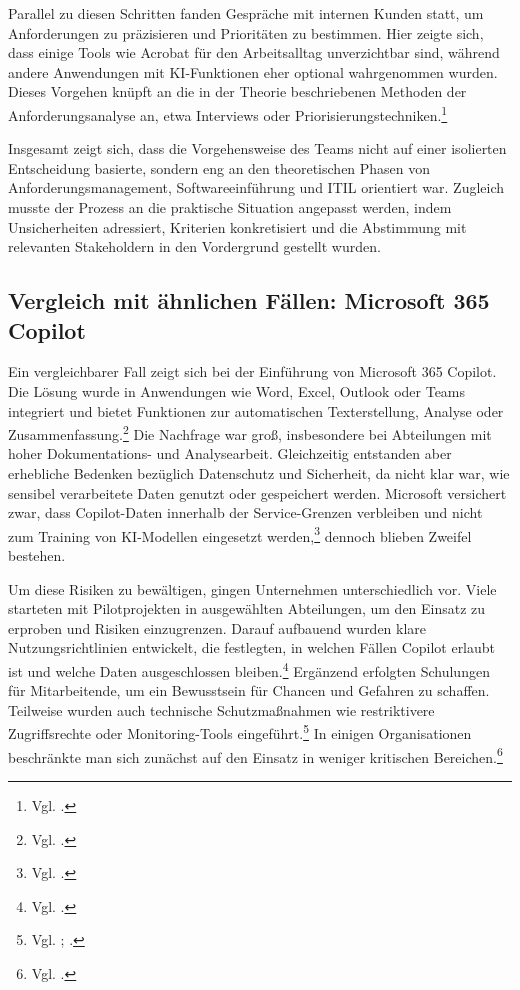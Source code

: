 \documentclass[
    12pt, 
    a4paper,
    ]{scrartcl} %
\begin{document}
Parallel zu diesen Schritten fanden Gespräche mit internen Kunden statt, um Anforderungen zu präzisieren und Prioritäten zu bestimmen. Hier zeigte sich, dass einige Tools wie Acrobat für den Arbeitsalltag unverzichtbar sind, während andere Anwendungen mit KI-Funktionen eher optional wahrgenommen wurden. Dieses Vorgehen knüpft an die in der Theorie beschriebenen Methoden der Anforderungsanalyse an, etwa Interviews oder Priorisierungstechniken.\footnote{Vgl. \cite{S_ISR}.}

Insgesamt zeigt sich, dass die Vorgehensweise des Teams nicht auf einer isolierten Entscheidung basierte, sondern eng an den theoretischen Phasen von Anforderungsmanagement, Softwareeinführung und ITIL orientiert war. Zugleich musste der Prozess an die praktische Situation angepasst werden, indem Unsicherheiten adressiert, Kriterien konkretisiert und die Abstimmung mit relevanten Stakeholdern in den Vordergrund gestellt wurden.

\subsection{Vergleich mit ähnlichen Fällen: Microsoft 365 Copilot}
Ein vergleichbarer Fall zeigt sich bei der Einführung von Microsoft 365 Copilot. Die Lösung wurde in Anwendungen wie Word, Excel, Outlook oder Teams integriert und bietet Funktionen zur automatischen Texterstellung, Analyse oder Zusammenfassung.\footnote{Vgl. \cite{S_MS_CopilotOverview}.} Die Nachfrage war groß, insbesondere bei Abteilungen mit hoher Dokumentations- und Analysearbeit. Gleichzeitig entstanden aber erhebliche Bedenken bezüglich Datenschutz und Sicherheit, da nicht klar war, wie sensibel verarbeitete Daten genutzt oder gespeichert werden. Microsoft versichert zwar, dass Copilot-Daten innerhalb der Service-Grenzen verbleiben und nicht zum Training von KI-Modellen eingesetzt werden,\footnote{Vgl. \cite{S_MS_CopilotSecurity}.} dennoch blieben Zweifel bestehen.

Um diese Risiken zu bewältigen, gingen Unternehmen unterschiedlich vor. Viele starteten mit Pilotprojekten in ausgewählten Abteilungen, um den Einsatz zu erproben und Risiken einzugrenzen. Darauf aufbauend wurden klare Nutzungsrichtlinien entwickelt, die festlegten, in welchen Fällen Copilot erlaubt ist und welche Daten ausgeschlossen bleiben.\footnote{Vgl. \cite{S_Reco}.} Ergänzend erfolgten Schulungen für Mitarbeitende, um ein Bewusstsein für Chancen und Gefahren zu schaffen. Teilweise wurden auch technische Schutzmaßnahmen wie restriktivere Zugriffsrechte oder Monitoring-Tools eingeführt.\footnote{Vgl. \cite{S_Reco}; \cite{S_Kyndryl}.} In einigen Organisationen beschränkte man sich zunächst auf den Einsatz in weniger kritischen Bereichen.\footnote{Vgl. \cite{S_Reco}.} 
\end{document}
